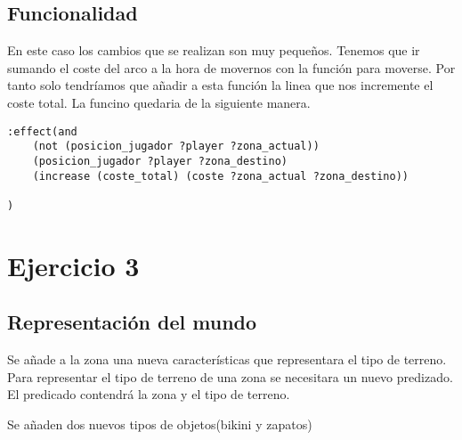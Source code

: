 \documentclass[]{article}
\begin{document}
\subsection{Funcionalidad}
En este caso los cambios que se realizan son muy pequeños. Tenemos que ir sumando el coste del arco a la hora de movernos con la función para moverse. Por tanto solo tendríamos que añadir a esta función la linea que nos incremente el coste total. La funcino quedaria de la siguiente manera. 

\begin{lstlisting}
:effect(and 
	(not (posicion_jugador ?player ?zona_actual))
	(posicion_jugador ?player ?zona_destino)
	(increase (coste_total) (coste ?zona_actual ?zona_destino))

)
\end{lstlisting}

\section{Ejercicio 3}
\subsection{Representación del mundo}
Se añade a la zona una nueva características que representara el tipo de terreno. Para representar el tipo de terreno de una zona se necesitara un nuevo predizado. El predicado contendrá la zona y el tipo de terreno. 



Se añaden dos nuevos tipos de objetos(bikini y zapatos)
\end{document}
